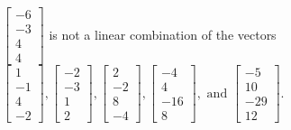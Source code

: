 \begin{exercise}
\begin{exerciseStatement}
  \end{exerciseStatement}
  \begin{exerciseAnswer}
   \(\left[\begin{array}{c}
-6 \\
-3 \\
4 \\
4
\end{array}\right]\) 
  	 is not  
	a linear combination of the vectors \(\left[\begin{array}{c}
1 \\
-1 \\
4 \\
-2
\end{array}\right] , \left[\begin{array}{c}
-2 \\
-3 \\
1 \\
2
\end{array}\right] , \left[\begin{array}{c}
2 \\
-2 \\
8 \\
-4
\end{array}\right] , \left[\begin{array}{c}
-4 \\
4 \\
-16 \\
8
\end{array}\right] , \text{ and } \left[\begin{array}{c}
-5 \\
10 \\
-29 \\
12
\end{array}\right]\).

	
  


  \end{exerciseAnswer}
\end{exercise}